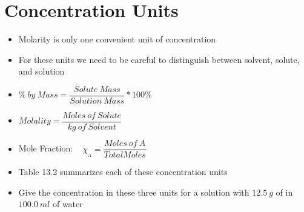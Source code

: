 \documentclass[12pt, openany, letterpaper]{memoir}
\begin{document}
\section{Concentration Units}
\begin{itemize}
	\item Molarity is only one convenient unit of concentration
	\item For these units we need to be careful to distinguish between solvent, solute, and solution
	\item $\%~by~Mass = \dfrac{Solute~Mass}{Solution~Mass}*100\%$
	\item $Molality = \dfrac{Moles~of~Solute}{kg~of~Solvent}$
	\item Mole Fraction: ~  $\chi_{_A}=\dfrac{Moles~of~A}{Total Moles}$
	\item Table 13.2 summarizes each of these concentration units
	\item Give the concentration in these three units for a solution with $12.5~g$ of  in $100.0~ml$ of water
\end{itemize}
\end{document}
